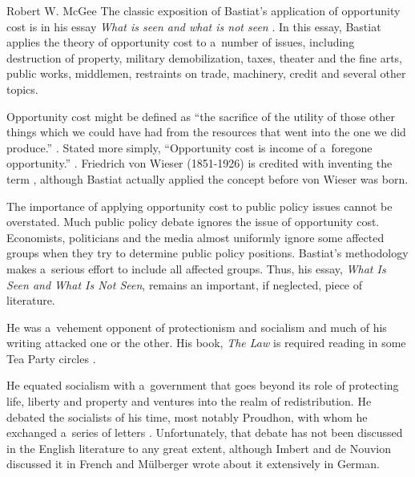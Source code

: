 \begin{artengenv}{Robert W. McGee}
The classic exposition of Bastiat's application of opportunity cost is in his essay \textit{What is seen and what is not seen} 
\parencites[][]{bastiat_ce_1850}[][pp.1–50]{bastiat_selected_1964}[][U:~1-48]{bastiat_bastiat_2007}. %
 In this essay, Bastiat applies the theory of opportunity cost to a~number of issues, including destruction of property, military demobilization, taxes, theater and the fine arts, public works, middlemen, restraints on trade, machinery, credit and several other topics.



Opportunity cost might be defined as ``the sacrifice of the utility of those other things which we could have had from the resources that went into the one we did produce.'' 
\parencite[][p.917]{schumpeter_history_1954}. %
 Stated more simply, ``Opportunity cost is income of a~foregone opportunity.'' 
\parencite[][]{magni_splitting_2009}. %
 Friedrich von Wieser (1851-1926) is credited with inventing the term 
\parencite[][p.184]{skousen_making_2001}, %
 although Bastiat actually applied the concept before von Wieser was born.



The importance of applying opportunity cost to public policy issues cannot be overstated. Much public policy debate ignores the issue of opportunity cost. Economists, politicians and the media almost uniformly ignore some affected groups when they try to determine public policy positions. Bastiat's methodology makes a~serious effort to include all affected groups. Thus, his essay, \textit{What Is Seen and What Is Not Seen}, remains an important, if neglected, piece of literature.



He was a~vehement opponent of protectionism and socialism and much of his writing attacked one or the other. His book, \textit{The Law} 
\parencite*[][]{bastiat_foreward_1998} %
 is required reading in some Tea Party circles 
\parencite[][]{zernike_shaping_2010}.%




He equated socialism with a~government that goes beyond its role of protecting life, liberty and property and ventures into the realm of redistribution. He debated the socialists of his time, most notably Proudhon, with whom he exchanged a~series of letters 
\parencite[][]{bastiat_sophismes_1873}. %
 Unfortunately, that debate has not been discussed in the English literature to any great extent, although Imbert 
\parencite*[][pp.57–66]{imbert_frederic_1913} %
 and de Nouvion 
\parencite*[][pp.256–269]{nouvion_frederic_1905} %
 discussed it in French and Mülberger 
\parencite*[][]{mulberger_kapital_1896} %
 wrote about it extensively in German.




\end{artengenv}
